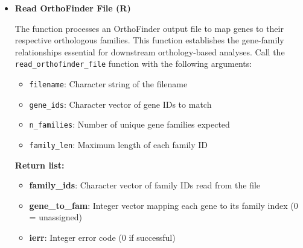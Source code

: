 \documentclass[11pt]{article}
\begin{document}
\begin{enumerate}
\begin{itemize}
\begin{itemize}
	      	      	\item \textbf{ierr}: Integer error code (0 if successful)
	      	      \end{itemize}
	      	      
	      	      \begin{lstlisting}[language=R, caption={R Read Expression Vectors}]
read_expression_vectors(file_list, gene_ids, n_header_rows, gene_col, 
    value_cols, n_samples, delimiter = "\t")
	      	      \end{lstlisting}
	      	      
	      	\item \textbf{Read OrthoFinder File (R)}
	      	      
	      	      The function processes an OrthoFinder output file to map genes to their respective
	      	      orthologous families. This function establishes the gene-family
	      	      relationships essential for downstream orthology-based analyses. Call the \texttt{read\_orthofinder\_file}
	      	      function with the following arguments:
	      	      
	      	      \begin{itemize}
	      	      	\item \texttt{filename}: Character string of the filename
	      	      	      
	      	      	\item \texttt{gene\_ids}: Character vector of gene IDs to match
	      	      	      
	      	      	\item \texttt{n\_families}: Number of unique gene families expected
	      	      	      
	      	      	\item \texttt{family\_len}: Maximum length of each family ID
	      	      \end{itemize}
	      	      
	      	      \textbf{Return list:}
	      	      \begin{itemize}
	      	      	\item \textbf{family\_ids}: Character vector of family IDs read from the
	      	      	      file
	      	      	      
	      	      	\item \textbf{gene\_to\_fam}: Integer vector mapping each gene to its family
	      	      	      index (0 = unassigned)
	      	      	      
	      	      	\item \textbf{ierr}: Integer error code (0 if successful)
	      	      \end{itemize}
	      	      

\end{itemize}
\end{enumerate}
\end{document}

